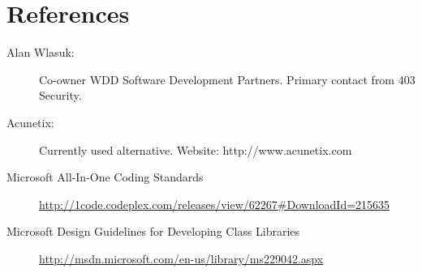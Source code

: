 \section{References}
\begin{description}
\item[Alan Wlasuk:]  Co-owner WDD Software Development Partners. Primary contact from 403 Security.
\item[Acunetix: ] Currently used alternative. Website: http://www.acunetix.com
\item[Microsoft All-In-One Coding Standards] \url{http://1code.codeplex.com/releases/view/62267#DownloadId=215635}
\item[Microsoft Design Guidelines for Developing Class Libraries] \url{http://msdn.microsoft.com/en-us/library/ms229042.aspx}
\end{description}
